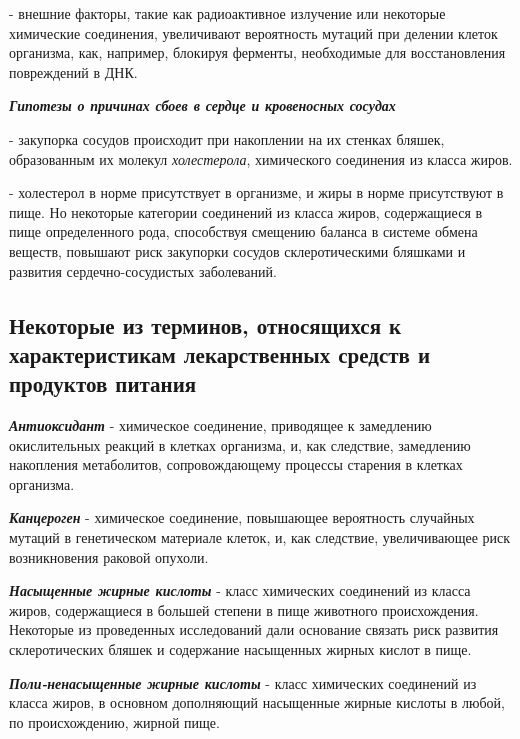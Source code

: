 - внешние факторы, такие как радиоактивное излучение или некоторые химические соединения, увеличивают вероятность мутаций при делении клеток организма, как, например, блокируя ферменты, необходимые для восстановления повреждений в ДНК.

\noindent
\textbf{ \textit{Гипотезы о причинах сбоев в сердце и кровеносных сосудах} } 

- закупорка сосудов происходит при накоплении на их стенках бляшек, образованным их молекул \textit{холестерола}, химического соединения из класса жиров.

- холестерол в норме присутствует в организме, и жиры в норме присутствуют в пище. Но некоторые категории соединений из класса жиров, содержащиеся в пище определенного рода, способствуя смещению баланса в системе обмена веществ, повышают риск закупорки сосудов склеротическими бляшками и развития сердечно-сосудистых заболеваний.

\subsection{Некоторые из терминов, относящихся к характеристикам лекарственных средств и продуктов питания}

\noindent
\textbf{ \textit{Антиоксидант} } - химическое соединение, приводящее к замедлению окислительных реакций в клетках организма, и, как следствие, замедлению накопления метаболитов, сопровождающему процессы старения в клетках организма.

\noindent
\textbf{ \textit{Канцероген} } - химическое соединение, повышающее вероятность случайных мутаций в генетическом материале клеток, и, как следствие, увеличивающее риск возникновения раковой опухоли.


\noindent
\textbf{ \textit{Насыщенные жирные кислоты} } - класс химических соединений из класса жиров, содержащиеся в большей степени в пище животного происхождения. Некоторые из проведенных исследований дали основание связать риск развития склеротических бляшек и содержание насыщенных жирных кислот в пище.

\noindent
\textbf{ \textit{Поли-ненасыщенные жирные кислоты} } - класс химических соединений из класса жиров, в основном дополняющий насыщенные жирные кислоты в любой, по происхождению, жирной пище.

